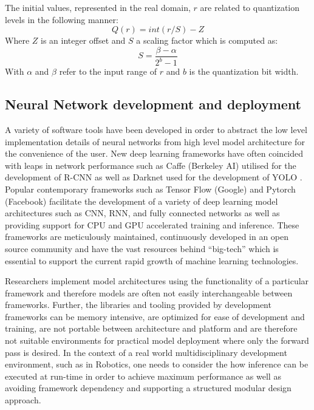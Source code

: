 \documentclass[a4paper,twoside,12pt]{report}
\begin{document}
The initial values, represented in the real domain, $r$ are related to quantization levels in the following manner:
\begin{equation}
Q(r) = int(r/S) - Z
\end{equation}
Where $Z$ is an integer offset and $S$ a scaling factor which is computed as:
\begin{equation}
S = \frac{\beta-\alpha}{2^b-1}
\end{equation}
With $\alpha$ and $\beta$ refer to the input range of $r$ and $b$ is the quantization bit width.

\subsection{Neural Network development and deployment}

A variety of software tools have been developed in order to abstract the low level implementation details of neural networks from high level model architecture for the convenience of the user. New deep learning frameworks have often coincided with leaps in network performance such as Caffe (Berkeley AI) \citep{caffe} utilised for the development of R-CNN \citep{rcnn} as well as Darknet used for the development of YOLO \citep{yolo}. Popular contemporary frameworks such as Tensor Flow (Google) \citep{tensorflow} and Pytorch (Facebook) \citep{pytorch} facilitate the development of a variety of deep learning model architectures such as CNN, RNN, and fully connected networks as well as providing support for CPU and GPU accelerated training and inference. These frameworks are meticulously maintained, continuously developed in an open source community and have the vast resources behind ``big-tech'' which is essential to support the current rapid growth of machine learning technologies.

Researchers implement model architectures using the functionality of a particular framework and therefore models are often not easily interchangeable between frameworks. Further, the libraries and tooling provided by development frameworks can be memory intensive, are optimized for ease of development and training, are not portable between  architecture and platform and are therefore not suitable environments for practical model deployment where only the forward pass is desired. In the context of a real world multidisciplinary development environment, such as in Robotics, one needs to consider the how inference can be executed at run-time in order to achieve maximum performance as well as avoiding framework dependency and supporting a structured modular design approach. 
\end{document}
